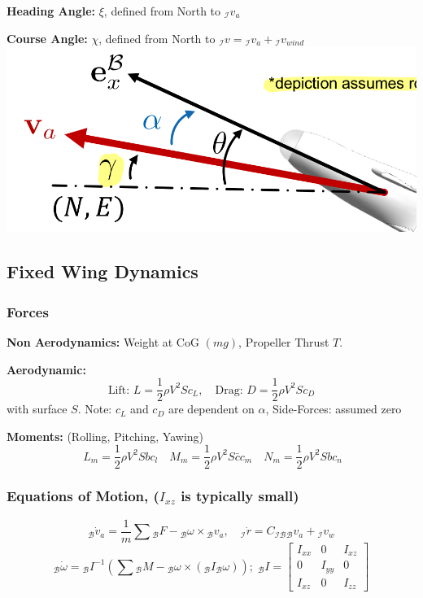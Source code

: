 \documentclass[fontsize=6pt,DIV=calc,a4paper,ngerman]{scrartcl}
\begin{document}
\begin{multicols*}{4}
\begin{minipage}{0.6\linewidth}
        \textbf{Heading Angle:} $\xi$, defined from North to ${}_\mathcal{I}v_a$

	    \textbf{Course Angle:} $\chi$, defined from North to ${}_\mathcal{I}v = {}_\mathcal{I}v_a + {}_\mathcal{I}v_{wind}$
	    \includegraphics[width=0.6\linewidth]{angles2.png}
	\end{minipage}

	\subsection{Fixed Wing Dynamics}
	\subsubsection{Forces}

	\textbf{Non Aerodynamics:} Weight at CoG $(mg)$, Propeller Thrust $T$.

	\textbf{Aerodynamic:}
	$$\text{Lift: }L=\frac{1}{2}\rho V^2Sc_L, \quad \text{Drag: } D=\frac{1}{2}\rho V^2Sc_D $$ with surface $S$.
	Note: $c_L$ and $c_D$ are dependent on $\alpha$, Side-Forces: assumed zero

	\textbf{Moments:} (Rolling, Pitching, Yawing)
	$$\ L_m = \frac{1}{2} \rho V^2 S b c_l  \quad 
	M_m = \frac{1}{2} \rho V^2 S \bar{c} c_m \quad  
	N_m = \frac{1}{2} \rho V^2 S b c_n$$

	\subsubsection{Equations of Motion, ($I_{xz}$ is typically small)}
	$${}_\mathcal{B}\dot{v}_a= \frac{1}{m}\sum{}_\mathcal{B}F - {}_\mathcal{B}\omega \times {}_\mathcal{B}v_a, \quad {}_\mathcal{I}\dot{r}=C_\mathcal{IB} {}_\mathcal{B}v_a+{}_\mathcal{I}v_w$$
	$${}_\mathcal{B}\dot{\omega}={}_\mathcal{B}I^{-1}\left(\sum {}_\mathcal{B}M -{}_\mathcal{B}\omega \times ({}_\mathcal{B}I{}_\mathcal{B}\omega)\right); \; {}_\mathcal{B}I = \left[\begin{smallmatrix}I_{xx} & 0 & I_{xz}\\ 0 & I_{yy} & 0 \\ I_{xz} & 0 & I_{zz}\end{smallmatrix}\right]$$



\end{multicols*}
\end{document}
